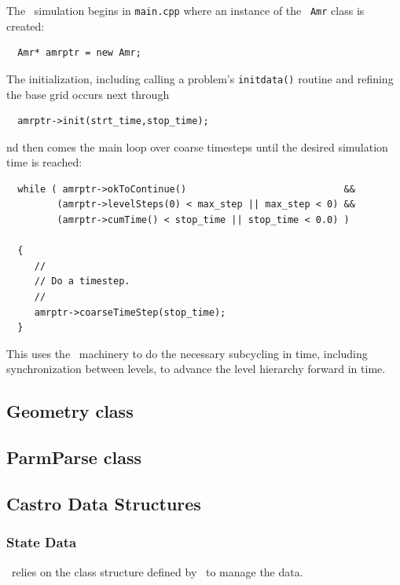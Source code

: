 The \castro\ simulation begins in {\tt main.cpp} where an instance
of the \boxlib\ {\tt Amr} class is created:
\begin{lstlisting}
  Amr* amrptr = new Amr;
\end{lstlisting}
The initialization, including calling a problem's {\tt initdata()}
routine and refining the base grid occurs next through
\begin{lstlisting}
  amrptr->init(strt_time,stop_time);
\end{lstlisting}
nd then comes the main loop over coarse timesteps until the
desired simulation time is reached:
\begin{lstlisting}
  while ( amrptr->okToContinue()                            &&
         (amrptr->levelSteps(0) < max_step || max_step < 0) &&
         (amrptr->cumTime() < stop_time || stop_time < 0.0) )

  {
     //
     // Do a timestep.
     //
     amrptr->coarseTimeStep(stop_time);
  }
\end{lstlisting}
This uses the \boxlib\ machinery to do the necessary subcycling in time,
including synchronization between levels, to advance the level hierarchy
forward in time.

\subsection{Geometry class}

\subsection{ParmParse class}

\subsection{Castro Data Structures}

\subsubsection{State Data}

\castro\ relies on the class structure defined by \boxlib\ to manage the
data.

